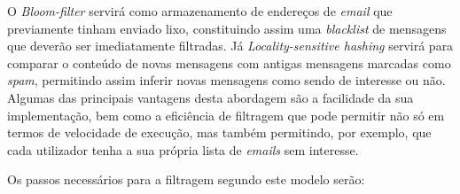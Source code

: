 \documentclass[a4paper,11pt,openright,oneside]{report}
\begin{document}
O \textit{Bloom-filter} servirá como armazenamento de endereços de \textit{email} que previamente tinham enviado lixo, constituindo assim uma \textit{blacklist} de mensagens que deverão ser imediatamente filtradas. Já \textit{Locality-sensitive hashing} servirá para comparar o conteúdo de novas mensagens com antigas mensagens marcadas como \textit{spam}, permitindo assim inferir novas mensagens como sendo de interesse ou não. Algumas das principais vantagens desta abordagem são a facilidade da sua implementação, bem como a eficiência de filtragem que pode permitir não só em termos de velocidade de execução, mas também permitindo, por exemplo, que cada utilizador tenha a sua própria lista de \textit{emails} sem interesse.

Os passos necessários para a filtragem segundo este modelo serão:
\end{document}

